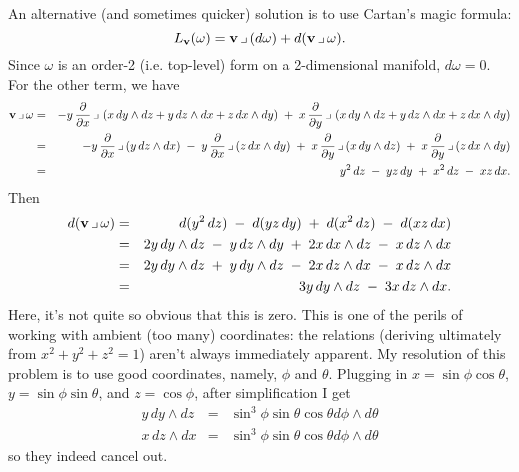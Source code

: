 \documentclass[10pt]{article}
\numberwithin{equation}{subsection}
\begin{document}
An alternative (and sometimes quicker) solution is to use Cartan's magic
formula:
$$
	L_{\mathbf{v}}(\omega) = \mathbf{v} \,\lrcorner\, (d\omega) + d(\mathbf{v} \,\lrcorner\, \omega).
$$
Since $\omega$ is an order-2 (i.e. top-level) form on a 2-dimensional manifold,
$d\omega=0$.  For the other term, we have
\begin{eqnarray*}
	\vecv \ctt \omega
	&=&   -y\, \fracDx \ctt
		\left(
			x\,dy\wedge dz +
			y\,dz\wedge dx +
			z\, dx\wedge dy
		\right)
	\;+\;  x\, \fracDy \ctt
		\left(
			x\,dy\wedge dz +
			y\,dz\wedge dx +
			z\, dx\wedge dy
		\right) \\
	&=&   -y\, \fracDx \ctt (y\, dz\wedge dx)
	\;-\;  y\, \fracDx \ctt (z\, dx\wedge dy)
	\;+\;  x\, \fracDy \ctt (x\, dy\wedge dz)
	\;+\;  x\, \fracDy \ctt (z\, dx\wedge dy) \\
%
	&=&    y^2 \, dz
	\;-\;  yz  \, dy
	\;+\;  x^2 \, dz
	\;-\;  xz  \, dx.
\end{eqnarray*}
Then
\begin{eqnarray*}
	d(\vecv \ctt \omega)
	&=&    d(y^2 \, dz)
	\;-\;  d(yz  \, dy)
	\;+\;  d(x^2 \, dz)
	\;-\;  d(xz  \, dx) \\
%
	&=&    2y \,dy \wedge dz
	\;-\;   y \,dz \wedge dy
	\;+\;  2x \,dx \wedge dz
	\;-\;   x \,dz \wedge dx \\
%
	&=&    2y \,dy \wedge dz
	\;+\;   y \,dy \wedge dz
	\;-\;  2x \,dz \wedge dx
	\;-\;   x \,dz \wedge dx \\
%
	&=&    3y \,dy \wedge dz
	\;-\;  3x \,dz \wedge dx.
\end{eqnarray*}
Here, it's not quite so obvious that this is zero.  This is one of the perils
of working with ambient (too many) coordinates:  the relations (deriving
ultimately from $x^2+y^2+z^2=1$) aren't always immediately apparent.  My
resolution of this problem is to use good coordinates, namely, $\phi$ and
$\theta$.  Plugging in $x=\sin\phi\cos\theta$, $y=\sin\phi\sin\theta$, and
$z=\cos\phi$, after simplification I get
\begin{eqnarray*}
	y \,dy\wedge dz &=& \sin^3\phi\sin\theta\cos\theta d\phi\wedge d\theta\\
	x \,dz\wedge dx &=& \sin^3\phi\sin\theta\cos\theta d\phi\wedge d\theta
\end{eqnarray*}
so they indeed cancel out.

\end{document}
